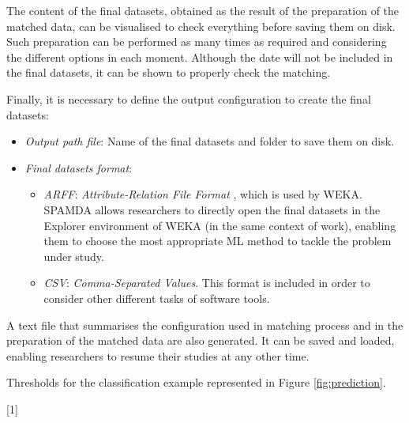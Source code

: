 \documentclass[energies,article,accept,moreauthors,pdftex]{Definitions/mdpi}
\begin{document}
\begin{paracol}{2}
				The content of the final datasets, obtained as the result of the preparation of the matched data, can be visualised to check everything before saving them on disk. Such preparation can be performed as many times as required and considering the different options in each moment. Although the date will not be included in the final datasets, it can be shown to properly check the matching.
				
				Finally, it is necessary to define the output configuration to create the final datasets:			
				\begin{itemize}

					\item \textit{Output path file}: Name of the final datasets and folder to save them on disk.
						
					\item \textit{Final datasets format}:

						\begin{itemize}
						
							\item \textit{ARFF}: \textit{Attribute-Relation File Format} \cite{WEKA_ARFF}, which is used by WEKA. SPAMDA allows researchers to directly open the final datasets in the Explorer environment of WEKA (in the same context of work), enabling them to choose the most appropriate ML method to tackle the problem under study.

							\item \textit{CSV}: \textit{Comma-Separated Values}. This format is included in order to consider other different tasks of software tools.
							
						\end{itemize}
					
				\end{itemize}
				
				A text file that summarises the configuration used in matching process and in the preparation of the matched data are also generated. It can be saved and loaded, enabling researchers to resume their studies at any other time.
				
    \begin{specialtable}[H]
						
							\caption{Thresholds for the classification example represented in Figure \ref{fig:prediction}.}
							\label{tab:thresholds}
\setlength{\cellWidtha}{\columnwidth/4-2\tabcolsep+0.0in}
\setlength{\cellWidthb}{\columnwidth/4-2\tabcolsep+0.0in}
\setlength{\cellWidthc}{\columnwidth/4-2\tabcolsep+0.0in}
\setlength{\cellWidthd}{\columnwidth/4-2\tabcolsep+0.0in}
\scalebox{1}[1]{\begin{tabularx}{\columnwidth}{>{\PreserveBackslash\centering}m{\cellWidtha}>{\PreserveBackslash\centering}m{\cellWidthb}>{\PreserveBackslash\centering}m{\cellWidthc}>{\PreserveBackslash\centering}m{\cellWidthd}}
\toprule


\end{tabularx}}
\end{specialtable}
\end{paracol}
\end{document}
